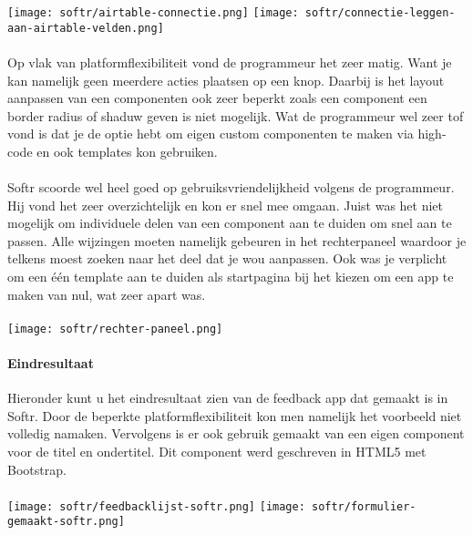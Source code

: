 \texttt{[image: softr/airtable-connectie.png]}
\texttt{[image: softr/connectie-leggen-aan-airtable-velden.png]}
\\
\\
Op vlak van platformflexibiliteit vond de programmeur het zeer matig. 
Want je kan namelijk geen meerdere acties plaatsen op een knop. 
Daarbij is het layout aanpassen van een componenten ook zeer beperkt zoals een component een border radius of shaduw geven is niet mogelijk. 
Wat de programmeur wel zeer tof vond is dat je de optie hebt om eigen custom componenten te maken via high-code en ook templates kon gebruiken.
\\
\\
Softr scoorde wel heel goed op gebruiksvriendelijkheid volgens de programmeur. 
Hij vond het zeer overzichtelijk en kon er snel mee omgaan. 
Juist was het niet mogelijk om individuele delen van een component aan te duiden om snel aan te passen. 
Alle wijzingen moeten namelijk gebeuren in het rechterpaneel waardoor je telkens moest zoeken naar het deel dat je wou aanpassen. 
Ook was je verplicht om een één template aan te duiden als startpagina bij het kiezen om een app te maken van nul, wat zeer apart was. 
\\
\\
\texttt{[image: softr/rechter-paneel.png]}
\paragraph*{Eindresultaat}
Hieronder kunt u het eindresultaat zien van de feedback app dat gemaakt is in Softr. Door de beperkte platformflexibiliteit kon men namelijk het voorbeeld niet volledig namaken. 
Vervolgens is er ook gebruik gemaakt van een eigen component voor de titel en ondertitel. Dit component werd geschreven in HTML5 met Bootstrap.
\\
\\
\texttt{[image: softr/feedbacklijst-softr.png]}
\texttt{[image: softr/formulier-gemaakt-softr.png]}
